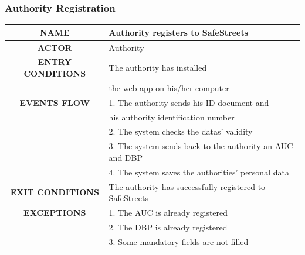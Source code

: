 \documentclass[12pt,a4paper]{article}
\begin{document}
\subsubsection{Authority Registration}
\begin{center}
			\begin{tabular}{| c | l |}
				\hline
				\textbf{NAME} & Authority registers to SafeStreets \\
				\hline
				\textbf{ACTOR} & Authority \\
				\hline
				\textbf{ENTRY CONDITIONS} & The authority has installed \\
				&	the web app on his/her computer\\
				\hline
				\textbf{EVENTS FLOW}  &
				1. The authority sends his ID document and\\
				& his authority identification number\\
				&2. The system checks the datas' validity\\
				&3. The system sends back to the authority an AUC and DBP\\
				&4. The system saves the authorities' personal data\\
				\hline
				\textbf{EXIT CONDITIONS}  & The authority has successfully registered to SafeStreets \\ 
				\hline
				\textbf{EXCEPTIONS} &
				1. The AUC is already registered\\
				&2. The DBP is already registered\\
				&3. Some mandatory fields are not filled\\
				\hline
			\end{tabular}
		\end{center}
\end{document}
